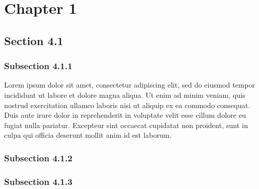 \chapter{Chapter 1}
\label{chap_01}

\section{Section 4.1}


\subsection{Subsection 4.1.1}

Lorem ipsum dolor sit amet, consectetur adipiscing elit, sed do eiusmod tempor incididunt ut labore et dolore magna aliqua. Ut enim ad minim veniam, quis nostrud exercitation ullamco laboris nisi ut aliquip ex ea commodo consequat. Duis aute irure dolor in reprehenderit in voluptate velit esse cillum dolore eu fugiat nulla pariatur. Excepteur sint occaecat cupidatat non proident, sunt in culpa qui officia deserunt mollit anim id est laborum.


\subsection{Subsection 4.1.2}


\subsection{Subsection 4.1.3}


